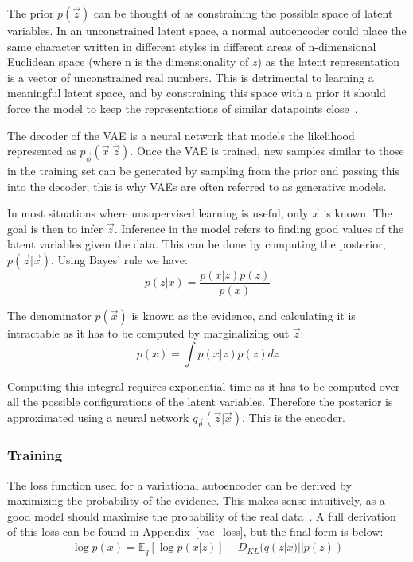 The prior $p(\vec{z})$ can be thought of as constraining the possible space of latent variables. In an unconstrained latent space, a
normal autoencoder could place the same character written in different styles in different areas of n-dimensional Euclidean space (where n is the 
dimensionality of $z$) as the latent representation is a vector of unconstrained real numbers. This is detrimental to learning a meaningful 
latent space, and by constraining this space with a prior it should force the model to keep the representations of similar datapoints close~\cite{Tutorial70:online}.

The decoder of the VAE is a neural network that models the likelihood represented as $p_{\vec{\phi}}(\vec{x}|\vec{z})$. Once the VAE is 
trained, new samples similar to 
those in the training set can be generated by sampling from the prior and passing this into the decoder; this is why VAEs are often
referred to as generative models.

In most situations where unsupervised learning is useful, only $\vec{x}$ is known. The goal is then to infer $\vec{z}$.
Inference in the model refers to finding good values of the latent variables given the data. This can be done by computing the
posterior, $p(\vec{z}|\vec{x})$. Using Bayes' rule we have:
\begin{equation}
  p(z|x) = \frac{p(x|z)p(z)}{p(x)}
\end{equation}

The denominator $p(\vec{x})$ is known as the evidence, and calculating it is intractable as it has to be computed by marginalizing out $\vec{z}$:
\begin{equation}
  p(x) = \int p(x|z)p(z) dz
\end{equation}

Computing this integral requires exponential time as it has to be computed over all the possible configurations of
the latent variables. Therefore the posterior is approximated using a neural network $q_{\vec{\theta}}(\vec{z}|\vec{x})$. 
This is the encoder.

\subsubsection{Training}

The loss function used for a variational autoencoder can be derived by maximizing the probability of the evidence.
This makes sense intuitively, as a good model should maximise the probability of the real data~\cite{SVIPartI90:online}. A full derivation
of this loss can be found in Appendix~\ref{vae_loss}, but the final form is below:
\begingroup
\allowdisplaybreaks
\begin{align}
  \log p(x) = \mathbb{E}_q [\log p(x|z)] - D_{KL}(q(z|x)||p(z))
\end{align}
\endgroup

